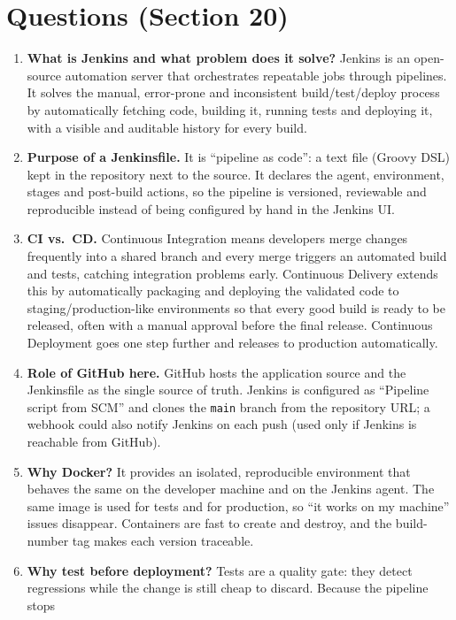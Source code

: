 \documentclass[11pt,a4paper]{article}
\begin{document}
\section{Questions (Section 20)}

\begin{enumerate}[label=\arabic*.]
\item \textbf{What is Jenkins and what problem does it solve?} Jenkins is an open-source
  automation server that orchestrates repeatable jobs through pipelines. It solves the
  manual, error-prone and inconsistent build/test/deploy process by automatically
  fetching code, building it, running tests and deploying it, with a visible and
  auditable history for every build.
\item \textbf{Purpose of a Jenkinsfile.} It is ``pipeline as code'': a text file (Groovy
  DSL) kept in the repository next to the source. It declares the agent, environment,
  stages and post-build actions, so the pipeline is versioned, reviewable and
  reproducible instead of being configured by hand in the Jenkins UI.
\item \textbf{CI vs.\ CD.} Continuous Integration means developers merge changes
  frequently into a shared branch and every merge triggers an automated build and
  tests, catching integration problems early. Continuous Delivery extends this by
  automatically packaging and deploying the validated code to staging/production-like
  environments so that every good build is ready to be released, often with a manual
  approval before the final release. Continuous Deployment goes one step further and
  releases to production automatically.
\item \textbf{Role of GitHub here.} GitHub hosts the application source and the
  Jenkinsfile as the single source of truth. Jenkins is configured as ``Pipeline script
  from SCM'' and clones the \texttt{main} branch from the repository URL; a webhook
  could also notify Jenkins on each push (used only if Jenkins is reachable from
  GitHub).
\item \textbf{Why Docker?} It provides an isolated, reproducible environment that
  behaves the same on the developer machine and on the Jenkins agent. The same image is
  used for tests and for production, so ``it works on my machine'' issues disappear.
  Containers are fast to create and destroy, and the build-number tag makes each
  version traceable.
\item \textbf{Why test before deployment?} Tests are a quality gate: they detect
  regressions while the change is still cheap to discard. Because the pipeline stops

\end{enumerate}
\end{document}
